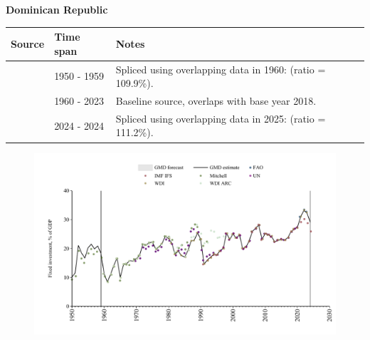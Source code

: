 \documentclass[12pt,a4paper,landscape]{article}
\begin{document}
\begin{adjustbox}{max totalsize={\paperwidth}{\paperheight},center}
\begin{minipage}[t][\textheight][t]{\textwidth}
\vspace*{0.5cm}
{}
\begin{center}
{\Large\bfseries Dominican Republic}
\end{center}
\vspace{0.5cm}
\begin{table}[H]
\centering
\small
\begin{tabular}{|l|l|l|}
\hline
\textbf{Source} & \textbf{Time span} & \textbf{Notes} \\
\hline
\rowcolor{white}\cite{Mitchell}& 1950 - 1959 &Spliced using overlapping data in 1960: (ratio = 109.9\%).\\
\rowcolor{lightgray}\cite{WDI}& 1960 - 2023 &Baseline source, overlaps with base year 2018.\\
\rowcolor{white}\cite{IMF_IFS}& 2024 - 2024 &Spliced using overlapping data in 2025: (ratio = 111.2\%).\\
\hline
\end{tabular}
\end{table}
\begin{figure}[H]
\centering
\includegraphics[width=\textwidth,height=0.6\textheight,keepaspectratio]{graphs/DOM_finv_GDP.pdf}
\end{figure}
\end{minipage}
\end{adjustbox}
\end{document}
